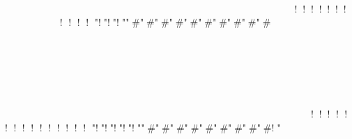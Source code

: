 




















		
	





	
	







													






													
	








					









    !!!!!!!       ! ! ! ! "!"!"!""#"#"#"#"#"#"#"#"#"#














			















	
	
























		
	













													


















				
	








					








   !!! ! ! ! ! ! ! ! ! ! ! ! ! "!"!"!"!"!""#"#"#"#"#"#"#"#"#!"















			
















	
	




















